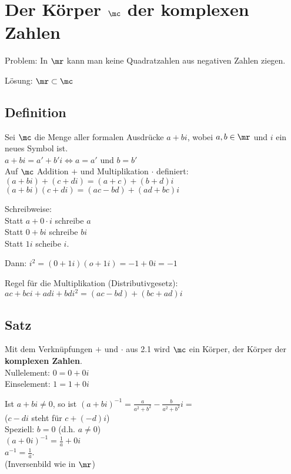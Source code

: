 \section{Der Körper \texorpdfstring{$\mathbb{\mc}$}{C} der komplexen Zahlen}

Problem: In $\mr$ kann man keine Quadratzahlen aus negativen Zahlen ziegen.

Lösung: $\mr\subset\mc$

\subsection{Definition}
	Sei $\mc$ die Menge aller formalen Ausdrücke $a+bi$, wobei $a,b\in\mr$ und $i$ ein neues Symbol ist.\\
	$a+bi=a'+b'i\Leftrightarrow a=a'$ und $b=b'$\\
	Auf $\mc$ Addition $+$ und Multiplikation $\cdot$ definiert:\\
	$(a+bi)+(c+di)=(a+c)+(b+d)i$\\
	$(a+bi)(c+di)=(ac-bd)+(ad+bc)i$
	
	Schreibweise:\\
	Statt $a+0\cdot i$ schreibe $a$\\
	Statt $0+bi$ schreibe $bi$\\
	Statt $1i$ scheibe $i$.
	
	Dann: $i^2=(0+1i)(o+1i)=-1+0i=-1$
	
	Regel für die Multiplikation (Distributivgesetz):\\
	$ac+bci+adi+bdi^2=(ac-bd)+(bc+ad)i$
	
\subsection{Satz}
		\item Mit dem Verknüpfungen $+$ und $\cdot$ aus 2.1 wird $\mc$ ein Körper, der Körper der \textbf{komplexen Zahlen}.\\
		Nullelement: $0=0+0i$\\
		Einselement: $1=1+0i$
		\item Ist $a+bi\neq 0$, so ist $(a+bi)^{-1}=\frac{a}{a^2+b^2}-\frac{b}{a^2+b^2}i=$\\
		($c-di$ steht für $c+(-d)i$)\\
		Speziell: $b=0$ (d.h. $a\neq 0$)\\
		$(a+0i)^{-1}=\frac{1}{a}+0i$\\
		$a^{-1}=\frac{1}{a}$.\\
		(Inversenbild wie in $\mr$)
		
